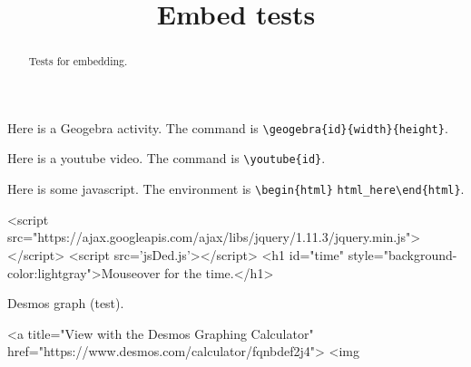 \documentclass{ximera}
\title{Embed tests}
\begin{document}
	
\begin{abstract}
Tests for embedding.
\end{abstract}

\maketitle

Here is a Geogebra activity. The command is \verb!\geogebra{id}{width}{height}!.


Here is a youtube video. The command is \verb!\youtube{id}!.


Here is some javascript. The environment is \verb!\begin{html}! \verb!html_here!\verb!\end{html}!.

\begin{html}
<script src="https://ajax.googleapis.com/ajax/libs/jquery/1.11.3/jquery.min.js"></script>
<script src='jsDed.js'></script>
<h1 id="time" style="background-color:lightgray">Mouseover for the time.</h1>
\end{html}

Desmos graph (test).


\begin{html}
<a title="View with the Desmos Graphing Calculator" href="https://www.desmos.com/calculator/fqnbdef2j4">  <img %
\end{html}
\end{document}
